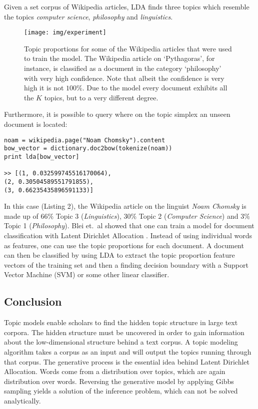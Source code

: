 \documentclass[a4paper,ngerman, english]{atseminar}
\begin{document}
\noindent
Given a set corpus of Wikipedia articles, LDA finds three topics which resemble the topics \textit{computer science},
\textit{philosophy} and \textit{linguistics}. 


\begin{figure}
\centering
\texttt{[image: img/experiment]}
 \caption{Topic proportions for some of the Wikipedia articles that were used to train the model. The Wikipedia
 article on `Pythagoras', for instance, is classified as a document in the category `philosophy' with very high confidence.
 Note that albeit the confidence is very high it is not $100\%$. Due to the model every document exhibits all the $K$ topics, but to a very different degree.}
   \label{fig:experiments}
\end{figure}

\noindent
Furthermore, it is possible to query where on the topic simplex an unseen document is located:

\begin{lstlisting}[label=noam,caption=\; Query for a document]
noam = wikipedia.page("Noam Chomsky").content
bow_vector = dictionary.doc2bow(tokenize(noam))
print lda[bow_vector]

>> [(1, 0.032599745516170064), 
(2, 0.30504589551791855),
(3, 0.66235435896591133)]
\end{lstlisting}


In this case (Listing 2), the Wikipedia article on the linguist \textit{Noam Chomsky} is made up of
$66\%$ Topic 3 (\textit{Linguistics}), $30\%$ Topic 2 (\textit{Computer Science}) and
$3\%$ Topic 1 (\textit{Philosophy}).
Blei et.~al showed that one can train a model for document classification with Latent Dirichlet Allocation \cite{blei2003latent}. Instead of using individual words as features, one can use the topic proportions for each document. 
A document can then be classified by using LDA to extract the topic proportion feature vectors of the training 
set and then a finding decision boundary with a Support Vector Machine (SVM) or some other linear classifier.

\clearpage

\subsection{Conclusion}

Topic models enable scholars to find the hidden topic structure in large text 
corpora. The hidden structure must be uncovered in order to gain information 
about the low-dimensional structure behind a text corpus.
A topic modeling algorithm takes a corpus as an input and will output the topics
running through that corpus.
The generative process is the essential idea behind Latent Dirichlet Allocation.
Words come from a distribution over topics, which are again distribution over words.
Reversing the generative model by applying Gibbs sampling yields a solution of 
the inference problem, which can not be solved analytically. 

\vspace{3cm}





\end{document}
